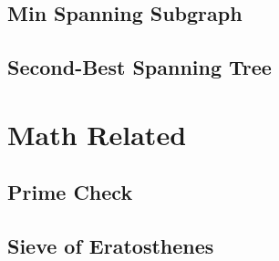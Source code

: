 	\subsection{Min Spanning Subgraph}
	\subsection{Second-Best Spanning Tree}
		


\section{Math Related}
	\subsection{Prime Check}
	\subsection{Sieve of Eratosthenes}

